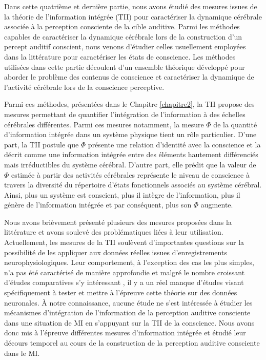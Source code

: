 Dans cette quatrième et dernière partie, nous avons étudié des mesures issues de la théorie de l'information intégrée (TII) pour caractériser la dynamique cérébrale associée à la perception consciente de la cible auditive. 
Parmi les méthodes capables de caractériser la dynamique cérébrale lors de la construction d'un percept auditif conscient, nous venons d'étudier celles usuellement employées dans la littérature pour caractériser les états de conscience. 
Les méthodes utilisées dans cette partie découlent d'un ensemble théorique développé pour aborder le problème des contenus de conscience et caractériser la dynamique de l'activité cérébrale lors de la conscience perceptive. 

Parmi ces méthodes, présentées dans le Chapitre \ref{chapitre2}, la TII propose des mesures permettant de quantifier l'intégration de l'information à des échelles cérébrales différentes. 
Parmi ces mesures notamment, la mesure $\Phi$ de la quantité d'information intégrée dans un système physique tient un rôle particulier. 
D'une part, la TII postule que $\Phi$ présente une relation d'identité avec la conscience et la décrit comme une information intégrée entre des éléments hautement différenciés mais irréductibles du système cérébral. 
D'autre part, elle prédit que la valeur de $\Phi$ estimée à partir des activités cérébrales représente le niveau de conscience à travers la diversité du répertoire d'états fonctionnels associés au système cérébral. 
Ainsi, plus un système est conscient, plus il intègre de l'information, plus il génère de l'information intégrée et par conséquent, plus son $\Phi$ augmente. 

Nous avons brièvement présenté plusieurs des mesures proposées dans la littérature et avons soulevé des problématiques liées à leur utilisation. 
Actuellement, les mesures de la TII soulèvent d'importantes questions sur la possibilité de les appliquer aux données réelles issues d'enregistrements neurophysiologiques.
Leur comportement, à l'exception des cas les plus simples, n'a pas été caractérisé de manière approfondie et malgré le nombre croissant d'études comparatives s'y intéressant \citep{barrett2011practical, barrett2019phi, haun2016contents, haun2017conscious, isler2018integrated, kim2018estimating, kim2019criticality, kitazono2018efficient, mediano2019measuring, oizumi2016measuring, seth2011causal, tegmark2016improved, toker2019information}, il y a un réel manque d'études visant spécifiquement à tester et mettre à l'épreuve cette théorie sur des données neuronales. 
À notre connaissance, aucune étude ne s'est intéressée à étudier les mécanismes d'intégration de l'information de la perception auditive consciente dans une situation de MI en s'appuyant sur la TII de la conscience. 
Nous avons donc mis à l'épreuve différentes mesures d'information intégrée et étudié leur décours temporel au cours de la construction de la perception auditive consciente dans le MI. 

